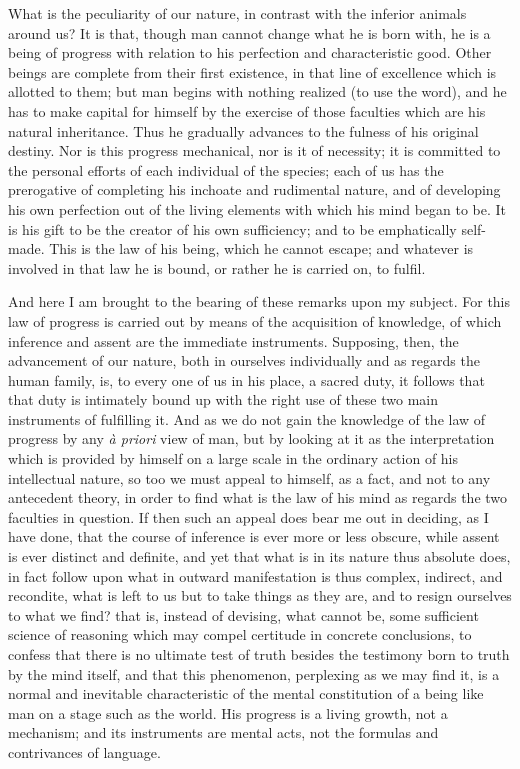 What is the peculiarity of our nature, in contrast with the
inferior animals around us? It is that, though man cannot change what
he is born with, he is a being of progress with relation to his
perfection and characteristic good. Other beings are complete from
their first existence, in that line of excellence which is allotted to
them; but man begins with nothing realized (to use the word), and he
has to make capital for himself by the exercise of those faculties
which are his natural inheritance. Thus he gradually advances to the
fulness of his original destiny. Nor is this progress mechanical, nor
is it of necessity; it is committed to the personal efforts of each
individual of the species; each of us has the prerogative of
completing his inchoate and rudimental nature, and of developing his
own perfection out of the living elements with which his mind began to
be. It is his gift to be the creator of his own sufficiency; and to be
emphatically self-made. This is the law of his being, which he cannot
escape; and whatever is involved in that law he is bound, or rather he
is carried on, to fulfil.

And here I am brought to the bearing of these remarks upon my
subject. For this law of progress is carried out by means of the
acquisition of knowledge, of which inference and assent are the
immediate instruments. Supposing, then, the advancement of our nature,
both in ourselves individually and as regards the human family, is, to
every one of us in his place, a sacred duty, it follows that that duty
is intimately bound up with the right use of these two main
instruments of fulfilling it. And as we do not gain the knowledge of
the law of progress by any \emph{à priori} view of man, but by
looking at it as the interpretation which is provided by himself on a
large scale in the ordinary action of his intellectual nature, so too
we must appeal to himself, as a fact, and not to any antecedent
theory, in order to find what is the law of his mind as regards the
two faculties in question. If then such an appeal does bear me out in
deciding, as I have done, that the course of inference is ever more or
less obscure, while assent is ever distinct and definite, and yet that
what is in its nature thus absolute does, in fact follow upon what in
outward manifestation is thus complex, indirect, and recondite, what
is left to us but to take things as they are, and to resign ourselves
to what we find? that is, instead of devising, what cannot be, some
sufficient science of reasoning which may compel certitude in concrete
conclusions, to confess that there is no ultimate test of truth
besides the testimony born to truth by the mind itself, and that this
phenomenon, perplexing as we may find it, is a normal and inevitable
characteristic of the mental constitution of a being like man on a
stage such as the world. His progress is a living growth, not a
mechanism; and its instruments are mental acts, not the formulas and
contrivances of language.

